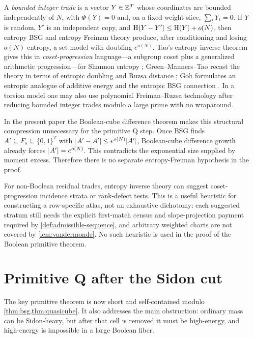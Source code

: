 \documentclass[11pt,a4paper]{amsart}
\numberwithin{equation}{section}
\theoremstyle{remark}
\begin{document}
A \emph{bounded integer trade} is a vector \(Y\in\mathbb Z^T\) whose
coordinates are bounded independently of \(N\), with \(\Phi(Y)=0\) and,
on a fixed-weight slice, \(\sum_tY_t=0\).  If \(Y\) is random, \(Y'\) is
an independent copy, and
\(\operatorname{H}(Y-Y')\le \operatorname{H}(Y)+o(N)\), then entropy BSG and entropy Freiman
theory produce, after conditioning and losing \(o(N)\) entropy, a set
model with doubling \(e^{o(N)}\).  Tao's entropy inverse theorem gives
this in \emph{coset-progression} language---a subgroup coset plus a
generalized arithmetic progression---for Shannon entropy \cite{TaoEntropy};
Green--Manners--Tao recast the theory in terms of entropic doubling and
Ruzsa distance \cite{GreenMannersTao}; Goh formulates an entropic analogue
of additive energy and the entropic BSG connection \cite{GohEnergy}.  In a
torsion model one may also use polynomial Freiman--Ruzsa technology after
reducing bounded integer trades modulo a large prime with no wraparound.

In the present paper the Boolean-cube difference theorem makes this
structural compression unnecessary for the primitive Q step.  Once BSG
finds \(A'\subseteq F_s\subseteq\{0,1\}^T\) with
\(\lvert A'-A'\rvert\le e^{o(N)}\lvert A'\rvert\), Boolean-cube difference growth
already forces \(\lvert A'\rvert=e^{o(N)}\).  This contradicts the exponential
size supplied by moment excess.  Therefore there is no separate
entropy-Freiman hypothesis in the proof.

For non-Boolean residual trades, entropy inverse theory can suggest
coset-progression incidence strata or rank-defect tests.  This is a useful
heuristic for constructing a row-specific atlas, not an exhaustive
dichotomy: each suggested stratum still needs the explicit first-match census and
slope-projection payment required by \cref{def:admissible-sequence}, and arbitrary weighted charts
are not covered by \cref{lem:vandermonde}.  No such heuristic is used in
the proof of the Boolean primitive theorem.

\section{Primitive Q after the Sidon cut}\label{sec:primitive-q-proof}

The key primitive theorem is now short and self-contained modulo \cref{thm:bsg,thm:quasicube}.  It also addresses the main obstruction: ordinary \Renyi{} mass can be Sidon-heavy, but after that cell is removed it must be high-energy, and high-energy is impossible in a large Boolean fiber.
\end{document}
